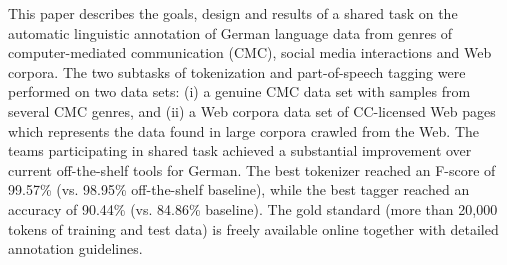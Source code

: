 This paper describes the goals, design and results of a shared task on the automatic linguistic annotation of German language data from genres of computer-mediated communication (CMC), social media interactions and Web corpora. The two subtasks of tokenization and part-of-speech tagging were performed on two data sets: (i) a genuine CMC data set with samples from several CMC genres, and (ii) a Web corpora data set of CC-licensed Web pages which represents the data found in large corpora crawled from the Web. The teams participating in shared task achieved a substantial improvement over current off-the-shelf tools for German. The best tokenizer reached an F-score of 99.57\% (vs. 98.95\% off-the-shelf baseline), while the best tagger reached an accuracy of 90.44\% (vs. 84.86\% baseline). The gold standard (more than 20,000 tokens of training and test data) is freely available online together with detailed annotation guidelines.
